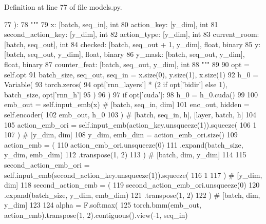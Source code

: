 Definition at line 77 of file models.\+py.


\begin{DoxyCode}
77     ):
78         \textcolor{stringliteral}{"""}
79 \textcolor{stringliteral}{        x: [batch, seq\_in], int}
80 \textcolor{stringliteral}{        action\_key: [y\_dim], int}
81 \textcolor{stringliteral}{        second\_action\_key: [y\_dim], int}
82 \textcolor{stringliteral}{        action\_type: [y\_dim], int}
83 \textcolor{stringliteral}{        current\_room: [batch, seq\_out], int}
84 \textcolor{stringliteral}{        checked: [batch, seq\_out + 1, y\_dim], float, binary}
85 \textcolor{stringliteral}{        y: [batch, seq\_out, y\_dim], float, binary}
86 \textcolor{stringliteral}{        y\_mask: [batch, seq\_out, y\_dim], float, binary}
87 \textcolor{stringliteral}{        counter\_feat: [batch, seq\_out, y\_dim], int}
88 \textcolor{stringliteral}{        """}
89 
90         opt = self.opt
91         batch\_size, seq\_out, seq\_in = x.size(0), y.size(1), x.size(1)
92         h\_0 = Variable(
93             torch.zeros(
94                 opt[\textcolor{stringliteral}{'rnn\_layers'}] * (2 \textcolor{keywordflow}{if} opt[\textcolor{stringliteral}{'bidir'}] \textcolor{keywordflow}{else} 1), batch\_size, opt[\textcolor{stringliteral}{'rnn\_h'}]
95             )
96         )
97         \textcolor{keywordflow}{if} opt[\textcolor{stringliteral}{'cuda'}]:
98             h\_0 = h\_0.cuda()
99 
100         emb\_out = self.input\_emb(x)  \textcolor{comment}{# [batch, seq\_in, dim]}
101         enc\_out, hidden = self.encoder(
102             emb\_out, h\_0
103         )  \textcolor{comment}{# [batch, seq\_in, h], [layer, batch, h]}
104 
105         action\_emb\_ori = self.input\_emb(action\_key.unsqueeze(1)).squeeze(
106             1
107         )  \textcolor{comment}{# [y\_dim, dim]}
108         y\_dim, emb\_dim = action\_emb\_ori.size()
109         action\_emb = (
110             action\_emb\_ori.unsqueeze(0)
111             .expand(batch\_size, y\_dim, emb\_dim)
112             .transpose(1, 2)
113         )  \textcolor{comment}{# [batch, dim, y\_dim]}
114 
115         second\_action\_emb\_ori = self.input\_emb(second\_action\_key.unsqueeze(1)).squeeze(
116             1
117         )  \textcolor{comment}{# [y\_dim, dim]}
118         second\_action\_emb = (
119             second\_action\_emb\_ori.unsqueeze(0)
120             .expand(batch\_size, y\_dim, emb\_dim)
121             .transpose(1, 2)
122         )  \textcolor{comment}{# [batch, dim, y\_dim]}
123 
124         alpha = F.softmax(
125             torch.bmm(emb\_out, action\_emb).transpose(1, 2).contiguous().view(-1, seq\_in)

\end{DoxyCode}
